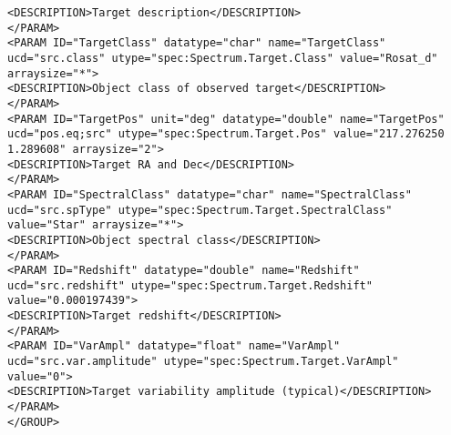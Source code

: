 \begin{landscape}
{\begin{flushleft}
\begin{fmlpage}
\begin{verbatim}
<DESCRIPTION>Target description</DESCRIPTION>
</PARAM>
<PARAM ID="TargetClass" datatype="char" name="TargetClass" ucd="src.class" utype="spec:Spectrum.Target.Class" value="Rosat_d" arraysize="*">
<DESCRIPTION>Object class of observed target</DESCRIPTION>
</PARAM>
<PARAM ID="TargetPos" unit="deg" datatype="double" name="TargetPos" ucd="pos.eq;src" utype="spec:Spectrum.Target.Pos" value="217.276250 1.289608" arraysize="2">
<DESCRIPTION>Target RA and Dec</DESCRIPTION>
</PARAM>
<PARAM ID="SpectralClass" datatype="char" name="SpectralClass" ucd="src.spType" utype="spec:Spectrum.Target.SpectralClass" value="Star" arraysize="*">
<DESCRIPTION>Object spectral class</DESCRIPTION>
</PARAM>
<PARAM ID="Redshift" datatype="double" name="Redshift" ucd="src.redshift" utype="spec:Spectrum.Target.Redshift" value="0.000197439">
<DESCRIPTION>Target redshift</DESCRIPTION>
</PARAM>
<PARAM ID="VarAmpl" datatype="float" name="VarAmpl" ucd="src.var.amplitude" utype="spec:Spectrum.Target.VarAmpl" value="0">
<DESCRIPTION>Target variability amplitude (typical)</DESCRIPTION>
</PARAM>
</GROUP>
\end{verbatim}
\end{fmlpage}


\end{flushleft}}
\end{landscape}
